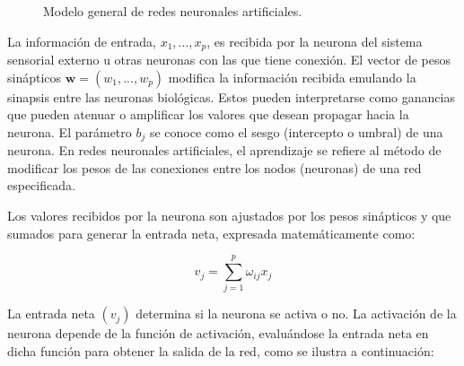 \documentclass[
  us-letterpaper,
]{scrreprt}
\theoremstyle{definition}
\theoremstyle{plain}
\theoremstyle{plain}
\theoremstyle{definition}
\theoremstyle{remark}
\begin{document}
\begin{figure}


\caption{\label{fig-modelogen}Modelo general de redes neuronales
artificiales.}

\end{figure}%

La información de entrada, \(x_1, ..., x_p\), es recibida por la neurona
del sistema sensorial externo u otras neuronas con las que tiene
conexión. El vector de pesos sinápticos \(\mathbf{w} = (w_1, ..., w_p)\)
modifica la información recibida emulando la sinapsis entre las neuronas
biológicas. Estos pueden interpretarse como ganancias que pueden atenuar
o amplificar los valores que desean propagar hacia la neurona. El
parámetro \(b_j\) se conoce como el sesgo (intercepto o umbral) de una
neurona. En redes neuronales artificiales, el aprendizaje se refiere al
método de modificar los pesos de las conexiones entre los nodos
(neuronas) de una red especificada.

Los valores recibidos por la neurona son ajustados por los pesos
sinápticos y que sumados para generar la entrada neta, expresada
matemáticamente como:

\[v_j=\sum_{j=1}^p \omega_{ij}x_j\]

La entrada neta \((v_j)\) determina si la neurona se activa o no. La
activación de la neurona depende de la función de activación,
evaluándose la entrada neta en dicha función para obtener la salida de
la red, como se ilustra a continuación:
\end{document}
